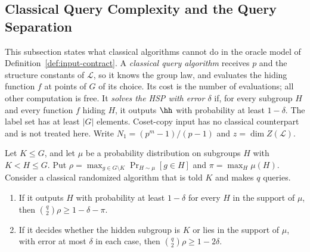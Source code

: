 
\subsection{Classical Query Complexity and the Query Separation}
\label{sec:classical-query}

This subsection states what classical algorithms cannot do in the oracle model of Definition~\ref{def:input-contract}. A \emph{classical query algorithm} receives $p$ and the structure constants of $\mathcal{L}$, so it knows the group law, and evaluates the hiding function $f$ at points of $G$ of its choice. Its cost is the number of evaluations; all other computation is free. It \emph{solves the HSP with error $\delta$} if, for every subgroup $H$ and every function $f$ hiding $H$, it outputs $\hh$ with probability at least $1-\delta$. The label set has at least $|G|$ elements. Coset-copy input has no classical counterpart and is not treated here. Write $N_1 = (p^m-1)/(p-1)$ and $z = \dim Z(\mathcal{L})$.

\begin{lemma}
\label{lem:collision}
Let $K \le G$, and let $\mu$ be a probability distribution on subgroups $H$ with $K < H \le G$. Put $\rho = \max_{g \in G\setminus K}\Pr_{H\sim\mu}[g\in H]$ and $\pi = \max_H \mu(H)$. Consider a classical randomized algorithm that is told $K$ and makes $q$ queries.
\begin{enumerate}[label=(\roman*),leftmargin=2em]
  \item If it outputs $H$ with probability at least $1-\delta$ for every $H$ in the support of $\mu$, then $\binom{q}{2}\rho \ge 1-\delta-\pi$.
  \item If it decides whether the hidden subgroup is $K$ or lies in the support of $\mu$, with error at most $\delta$ in each case, then $\binom{q}{2}\rho \ge 1-2\delta$.
\end{enumerate}
\end{lemma}

